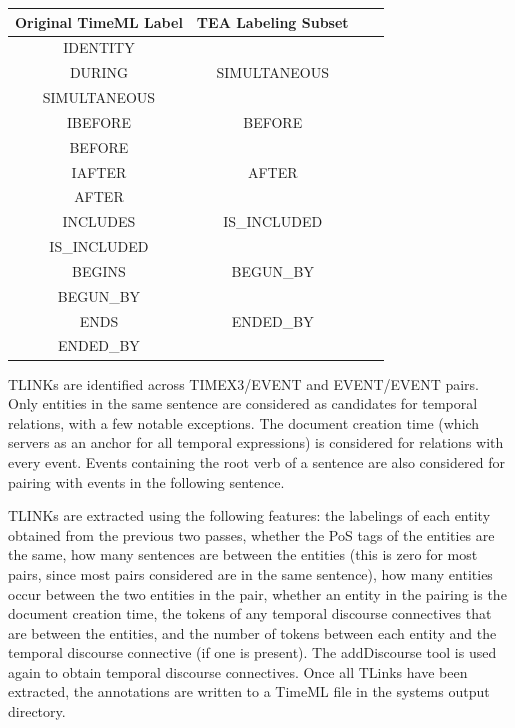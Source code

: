 \documentclass[11pt,letterpaper]{article}
\begin{document}
\begin{center}
	\begin{tabular}{ |c|c|c|c| } 
		\hline
		\textbf{Original TimeML Label} & \textbf{TEA Labeling Subset} \\
		\hline
		IDENTITY &  \\ 
		DURING & SIMULTANEOUS \\ 
		SIMULTANEOUS &  \\ 
		\hline
		IBEFORE & BEFORE \\
		BEFORE & \\
		\hline
		IAFTER & AFTER \\
		AFTER & \\
		\hline
		INCLUDES & IS\_INCLUDED \\
		IS\_INCLUDED & \\
		\hline
		BEGINS & BEGUN\_BY \\
		BEGUN\_BY & \\
		\hline
		ENDS & ENDED\_BY \\
		ENDED\_BY & \\
		\hline
		
	\end{tabular}
\end{center}

\vspace{5mm}

TLINKs are identified across TIMEX3/EVENT and EVENT/EVENT pairs. Only entities in the same sentence are considered as candidates for temporal relations, with a few notable exceptions. The document creation time (which servers as an anchor for all temporal expressions) is considered for relations with every event. Events containing the root verb of a sentence are also considered for pairing with events in the following sentence.

TLINKs are extracted using the following features: the labelings of each entity obtained from the previous two passes, whether the PoS tags of the entities are the same, how many sentences are between the entities (this is zero for most pairs, since most pairs considered are in the same sentence), how many entities occur between the two entities in the pair, whether an entity in the pairing is the document creation time, the tokens of any temporal discourse connectives that are between the entities, and the number of tokens between each entity and the temporal discourse connective (if one is present). The addDiscourse tool is used again to obtain temporal discourse connectives. Once all TLinks have been extracted, the annotations are written to a TimeML file in the systems output directory.
\end{document}
